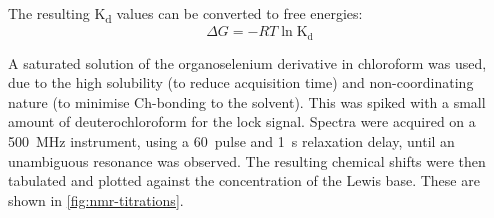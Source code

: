 \begin{refsection}
The resulting K\textsubscript{d} values can be converted to free energies:
\begin{equation}
    \Delta G = -RT \ln{\mathrm{K_d}}
\end{equation}

A saturated solution of the organoselenium derivative in chloroform was used, due to the high solubility (to reduce acquisition time) and non-coordinating nature (to minimise Ch-bonding to the solvent).
This was spiked with a small amount of deuterochloroform for the lock signal.
Spectra were acquired on a 500~MHz instrument, using a 60\degree~pulse and 1~s relaxation delay, until an unambiguous  resonance was observed.
The resulting chemical shifts were then tabulated and plotted against the concentration of the Lewis base.
These are shown in \cref{fig:nmr-titrations}.


\end{refsection}
